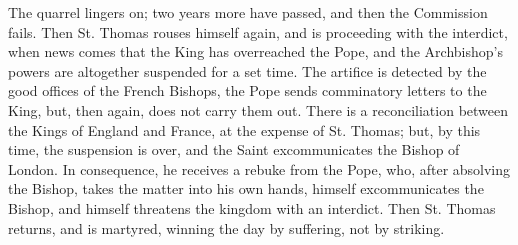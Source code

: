 The quarrel lingers on; two years more have passed, and then the
Commission fails. Then St. Thomas rouses himself again, and is
proceeding with the interdict, when news comes that the King has
overreached the Pope, and the Archbishop's powers are altogether
suspended for a set time. The artifice is detected by the good offices
of the French Bishops, the Pope sends comminatory letters to the King,
but, then again, does not carry them out. There is a reconciliation
between the Kings of England and France, at the expense of St. Thomas;
but, by this time, the suspension is over, and the Saint
excommunicates the Bishop of London. In consequence, he receives a
rebuke from the Pope, who, after absolving the Bishop, takes the
matter into his own hands, himself excommunicates the Bishop, and
himself threatens the kingdom with an interdict. Then St. Thomas
returns, and is martyred, winning the day by suffering, not by
striking.

